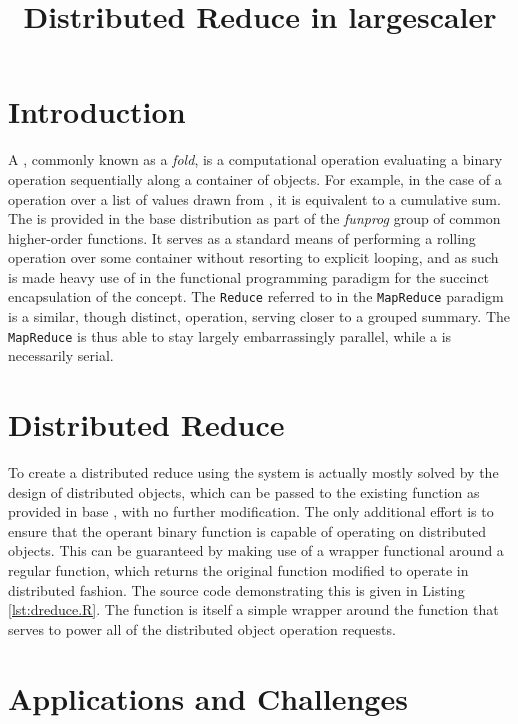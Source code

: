 \documentclass[10pt, a4paper]{article}
\begin{document}
\title{Distributed Reduce in largescaler}
  
\maketitle
\section{Introduction} %

A , commonly known as a \textit{fold}, is a computational operation evaluating a binary operation sequentially along a container of objects\cite{bird2010pearls}.
For example, in the case of a \hsrc{+} operation over a list of values drawn from \tbb, it is equivalent to a cumulative sum.
The  is provided in the base \R{} distribution as part of the \textit{funprog} group of common higher-order functions.
It serves as a standard means of performing a rolling operation over some container without resorting to explicit looping, and as such is made heavy use of in the functional programming paradigm for the succinct encapsulation of the concept.
The \texttt{Reduce} referred to in the \texttt{MapReduce} paradigm is a similar, though distinct, operation, serving closer to a grouped summary\cite{dean2004mapreduce}.
The \texttt{MapReduce} is thus able to stay largely embarrassingly parallel, while a  is necessarily serial.

\section{Distributed Reduce}

To create a distributed reduce using the \lsr{} system is actually mostly solved by the design of distributed objects, which can be passed to the existing  function as provided in base \R{}, with no further modification.
The only additional effort is to ensure that the operant binary function is capable of operating on distributed objects.
This can be guaranteed by making use of a  wrapper functional around a regular function, which returns the original function modified to operate in distributed fashion. 
The source code demonstrating this is given in Listing \ref{lst:dreduce.R}.
The  function is itself a simple wrapper around the  function that serves to power all of the \lsr{} distributed object operation requests.

\section{Applications and Challenges}

\end{document}
